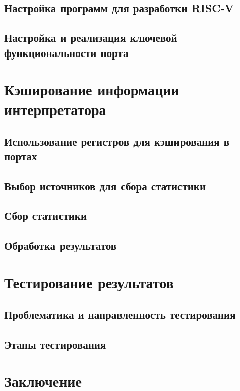 \documentclass[14pt]{spbau-diploma}
\begin{document}
\subsection{Настройка программ для разработки RISC-V}
\subsection{Настройка и реализация ключевой функциональности порта}



\section{Кэширование информации интерпретатора}
\subsection{Использование регистров для кэширования в портах}
\subsection{Выбор источников для сбора статистики}
\subsection{Сбор статистики}
\subsection{Обработка результатов}

\section{Тестирование результатов}  
\subsection{Проблематика и направленность тестирования}
\subsection{Этапы тестирования}


\section*{Заключение}




\end{document}
